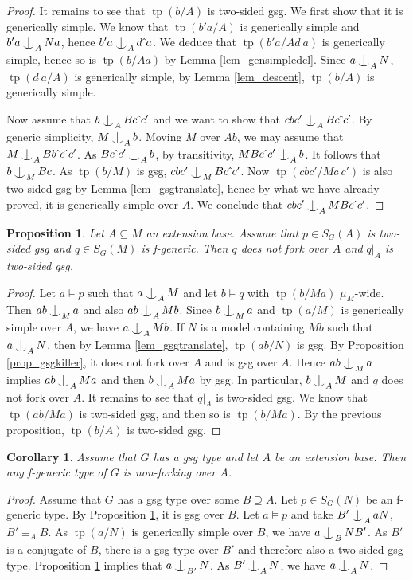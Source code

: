 \documentclass{amsart}
\makeatletter
\numberwithin{equation}{section}
\newtheorem{cor}[thm]{Corollary}
\newtheorem{prop}[thm]{Proposition}
\theoremstyle{definition}
\theoremstyle{mystyle}
\theoremstyle{remark}
\DeclareMathOperator{\tp}{tp}
\def\indsym#1#2{%
 \setbox0=\hbox{$\m@th#1x$}%
 \kern\wd0%
 \hbox to 0pt{\hss$\m@th#1\mid$\hbox to 0pt{$\m@th#1^{#2}$\hss}\hss}%
 \lower.9\ht0\hbox to 0pt{\hss$\m@th#1\smile$\hss}%
 \kern\wd0}
\newcommand{\ind}[1][]{\mathop{\mathpalette\indsym{#1}}}
\makeatother
\begin{document}
\begin{proof}
It remains to see that $\tp(b/A)$ is two-sided gsg. We first show that it is generically simple. We know that $\tp(b'a/A)$ is generically simple and $b'a \ind_A Na$, hence $b'a\ind_A d\hat{~}a$. We deduce that $\tp(b'a/Ad\hat{~}a)$ is generically simple, hence so is $\tp(b/Aa)$ by Lemma \ref{lem_gensimpledcl}. Since $a\ind_A N$, $\tp(d\hat{~}a/A)$ is generically simple, by Lemma \ref{lem_descent}, $\tp(b/A)$ is generically simple.

Now assume that $b\ind_A Bc\hat{~}c'$ and we want to show that $cbc'\ind_A Bc\hat{~}c'$. By generic simplicity, $M\ind_A b$. Moving $M$ over $Ab$, we may assume that $M\ind_A Bb\hat{~}c\hat{~}c'$. As $Bc\hat{~}c' \ind_A b$, by transitivity, $MBc\hat{~}c'\ind_A b$. It follows that $b\ind_M Bc$. As $\tp(b/M)$ is gsg, $cbc' \ind_M Bc\hat{~}c'$. Now $\tp(cbc'/Mc\hat{~}c')$ is also two-sided gsg by Lemma \ref{lem_gsgtranslate}, hence by what we have already proved, it is generically simple over $A$. We conclude that $cbc'\ind_A MBc\hat{~}c'$.
\end{proof}

\begin{prop}\label{prop_gsgkiller2}
Let $A\subseteq M$ an extension base. Assume that $p\in S_G(A)$ is two-sided gsg and $q\in S_G(M)$ is f-generic. Then $q$ does not fork over $A$ and $q|_A$ is two-sided gsg.
\end{prop}
\begin{proof}
Let $a\models p$ such that $a\ind_A M$ and let $b\models q$ with $\tp(b/Ma)$ $\mu_M$-wide. Then $ab\ind_M a$ and also $ab\ind_A Mb$. Since $b\ind_M a$ and $\tp(a/M)$ is generically simple over $A$, we have $a\ind_A Mb$. If $N$ is a model containing $Mb$ such that $a \ind_A N$, then by Lemma \ref{lem_gsgtranslate}, $\tp(ab/N)$ is gsg. By Proposition \ref{prop_gsgkiller}, it does not fork over $A$ and is gsg over $A$. Hence $ab\ind_M a$ implies $ab \ind_A Ma$ and then $b\ind_A Ma$ by gsg. In particular, $b\ind_A M$ and $q$ does not fork over $A$. It remains to see that $q|_A$ is two-sided gsg. We know that $\tp(ab/Ma)$ is two-sided gsg, and then so is $\tp(b/Ma)$. By the previous proposition, $\tp(b/A)$ is two-sided gsg.
\end{proof}

\begin{cor}
Assume that $G$ has a gsg type and let $A$ be an extension base. Then any f-generic type of $G$ is non-forking over $A$.
\end{cor}
\begin{proof}
Assume that $G$ has a gsg type over some $B\supseteq A$. Let $p\in S_G(N)$ be an f-generic type. By Proposition \ref{prop_gsgkiller2}, it is gsg over $B$. Let $a\models p$ and take $B'\ind_A aN$, $B'\equiv_A B$. As $\tp(a/N)$ is generically simple over $B$, we have $a\ind_B NB'$. As $B'$ is a conjugate of $B$, there is a gsg type over $B'$ and therefore also a two-sided gsg type. Proposition \ref{prop_gsgkiller2} implies that $a\ind_{B'} N$. As $B'\ind_A N$, we have $a\ind_A N$.
\end{proof}
\end{document}
